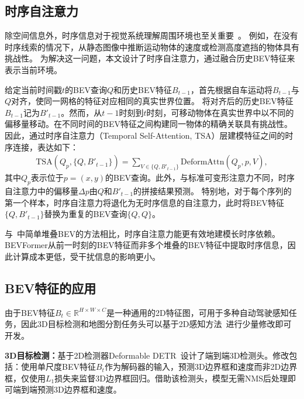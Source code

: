 \documentclass{article}
\begin{document}
\subsection{时序自注意力}\label{temporal_attention}
除空间信息外，时序信息对于视觉系统理解周围环境也至关重要~\cite{ma20223d}。
例如，在没有时序线索的情况下，从静态图像中推断运动物体的速度或检测高度遮挡的物体具有挑战性。
为解决这一问题，本文设计了时序自注意力，通过融合历史BEV特征来表示当前环境。



给定当前时间戳$t$的BEV查询$Q$和历史BEV特征$B_{t\!-\!1}$，首先根据自车运动将$B_{t\!-\!1}$与$Q$对齐，使同一网格的特征对应相同的真实世界位置。
将对齐后的历史BEV特征$B_{t\!-\!1}$记为$B'_{t\!-\!1}$。然而，从$t-1$时刻到$t$时刻，可移动物体在真实世界中以不同的偏移量移动。在不同时间的BEV特征之间构建同一物体的精确关联具有挑战性。
因此，通过时序自注意力（Temporal Self-Attention, TSA）层建模特征之间的时序连接，表达如下：
\begin{align}\label{MSDeformAttn}
    \text{TSA}(Q_p, \{Q, B'_{t-1}\}) =
    \sum_{V\in \{Q, B'_{t-1}\}} \text{DeformAttn}(Q_p, p, V),
\end{align}
其中$Q_p$表示位于$p=(x, y)$的BEV查询。此外，与标准可变形注意力不同，时序自注意力中的偏移量$\Delta p$由$Q$和$B'_{t-1}$的拼接结果预测。
特别地，对于每个序列的第一个样本，时序自注意力将退化为无时序信息的自注意力，此时将BEV特征$\{Q, B'_{t-1}\}$替换为重复的BEV查询$\{Q, Q\}$。

与~\cite{hu2021fiery,saha2021translating,can2020understanding}中简单堆叠BEV的方法相比，时序自注意力能更有效地建模长时序依赖。BEVFormer从前一时刻的BEV特征而非多个堆叠的BEV特征中提取时序信息，因此计算成本更低，受干扰信息的影响更小。




    


\subsection{BEV特征的应用}
由于BEV特征$B_t\in \mathbb{R}^{H\times W \times C}$是一种通用的2D特征图，可用于多种自动驾驶感知任务，因此3D目标检测和地图分割任务头可以基于2D感知方法~\cite{zhu2020deformable,li2021panoptic}进行少量修改即可开发。

\noindent\textbf{3D目标检测：}基于2D检测器Deformable DETR~\cite{zhu2020deformable}设计了端到端3D检测头。修改包括：使用单尺度BEV特征$B_t$作为解码器的输入，预测3D边界框和速度而非2D边界框，仅使用$L_1$损失来监督3D边界框回归。借助该检测头，模型无需NMS后处理即可端到端预测3D边界框和速度。
\end{document}
